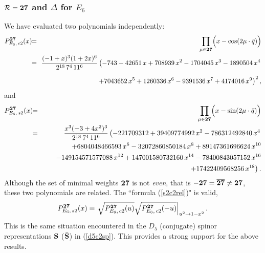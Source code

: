 \documentclass[a4paper,12pt]{article}
\newcommand{\vTb}{\vphantom{\mbox{\larl I}}}
\begin{document}
\subsubsection{${\cal R}={\bf 27}$ and $\Delta$ for $E_6$}

We have evaluated two polynomials independently:
\begin{eqnarray}
   P_{E_6,\,c2}^{\bf 27}(x)&\!\!=\!\!&\prod_{\mu\in{\bf 27}}
   \Bigl(x-\cos(2\mu\cdot\bar{q})\Bigr)\nonumber\\
%
   &\!\!=\!\!& {(-1 + x)^3(1 + 2x)^6\over{2^{18}\,7^4\,11^6}}
   \left(-743 - 42651\,x + 708939\,x^2 - 1704045\,x^3 -
          1890504\,x^4\right.\nonumber\\[6pt]
   &&\left.\qquad\qquad  + 7043652\,x^5 + 1260336\,x^6
   - 9391536\,x^7 + 4174016\,x^9\right)^2,
   \label{e6t27c}
\end{eqnarray}
and
\begin{eqnarray}
   P_{E_6,\,s2}^{\bf 27}(x)&\!\!=\!\!&\prod_{\mu\in{\bf 27}}
   \Bigl(x-\sin(2\mu\cdot\bar{q})\Bigr)\nonumber\\
%
   &\!\!=\!\!& {x^3(-3 + 4x^2)^3\over{2^{18}\,7^4\,11^6}}
   \left(-221709312 + 39409774992\,x^2 -
         786312492840\,x^4\right.\nonumber\\
   &&\qquad  + 6804048466593\,x^6 - 32072860850184\,x^8 +
         89147361696624\,x^{10}\nonumber\\
   &&\qquad - 149154571577088\,x^{12} + 147001580732160\,x^{14} -
         78400843057152\,x^{16}\nonumber\\
   &&\qquad\left. + 17422409568256\,x^{18}\right).
\end{eqnarray}
Although the set of minimal weights $\bf 27$ is not {\em even\/}, that is
$-{\bf 27}=\overline{\bf 27}\neq{\bf 27}$, these two polynomials are related.
The ``formula (\ref{s2c2rel})" is valid,
\begin{equation}
   P_{E_6,\,s2}^{\bf 27}(x)
   =\left.\vTb \sqrt{P_{E_6,\,c2}^{\bf 27}(u)}
   \sqrt{P_{E_6,\,c2}^{\bf 27}(-u)}\right|_{u^2\to1-x^2}.
\end{equation}
This is the same situation encountered in the $D_5$ (conjugate) spinor
representations $\bf S$ ($\bar{\bf S}$) in (\ref{d5c2sp}).
This provides a strong support for the above results.
\end{document}
